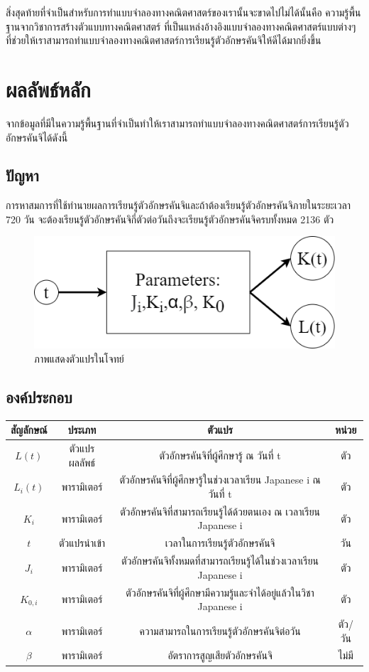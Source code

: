 \documentclass{article}
\begin{document}
สิ่งสุดท้ายที่จำเป็นสำหรับการทำแบบจำลองทางคณิตศาสตร์ของเรานั้นจะขาดไปไม่ได้นั้นคือ ความรู้พื้นฐานจากวิชาการสร้างตัวแบบทางคณิตศาสตร์\cite{MathematicalModeling} ที่เป็นแหล่งอ้างอิงแบบจำลองทางคณิตศาสตร์แบบต่างๆ ที่ช่วยให้เราสามารถทำแบบจำลองทางคณิตศาสตร์การเรียนรู้ตัวอักษรคันจิให้ดีได้มากยิ่งขึ้น

\section{ผลลัพธ์หลัก}
จากข้อมูลที่มีในความรู้พื้นฐานที่จำเป็นทำให้เราสามารถทำแบบจำลองทางคณิตศาสตร์การเรียนรู้ตัวอักษรคันจิได้ดังนี้

\subsection{ปัญหา} 
การหาสมการที่ใช้ทำนายผลการเรียนรู้ตัวอักษรคันจิและถ้าต้องเรียนรู้ตัวอักษรคันจิภายในระยะเวลา 720 วัน จะต้องเรียนรู้ตัวอักษรคันจิกี่ตัวต่อวันถึงจะเรียนรู้ตัวอักษรคันจิครบทั้งหมด 2136 ตัว
\begin{figure}[b]
\centering
\includegraphics[scale=0.5]{1.png}
\caption{ภาพแสดงตัวแปรในโจทย์}
\label{fig:inoutput}
\end{figure}
\subsection{องค์ประกอบ}
\begin{center}
\begin{tabular}{ |c|c|c|c| }
\hline
\textbf{สัญลักษณ์ } & \textbf{ประเภท } & \textbf{ตัวแปร } & \textbf{หน่วย } \\
\hline
$L(t)$ & ตัวแปรผลลัพธ์ & ตัวอักษรคันจิที่ผู้ศึกษารู้ ณ วันที่ t & ตัว \\
\hline
$L_i(t)$ & พารามิเตอร์ & ตัวอักษรคันจิที่ผู้ศึกษารู้ในช่วงเวลาเรียน Japanese i ณ วันที่ t & ตัว \\
\hline
$K_i$ & พารามิเตอร์ & ตัวอักษรคันจิที่สามารถเรียนรู้ได้ด้วยตนเอง ณ เวลาเรียน Japanese i & ตัว \\
\hline
$t$ & ตัวแปรนำเข้า & เวลาในการเรียนรู้ตัวอักษรคันจิ & วัน \\
\hline 
$J_i$ & พารามิเตอร์ & ตัวอักษรคันจิทั้งหมดที่สามารถเรียนรู้ได้ในช่วงเวลาเรียน Japanese i & ตัว \\
\hline
$K_{0,i}$ & พารามิเตอร์ & ตัวอักษรคันจิที่ผู้ศึกษามีความรู้และจำได้อยู่แล้วในวิชา Japanese i & ตัว \\
\hline
$\alpha$ & พารามิเตอร์ & ความสามารถในการเรียนรู้ตัวอักษรคันจิต่อวัน & ตัว/วัน \\
\hline 
$\beta $ & พารามิเตอร์ & อัตราการสูญเสียตัวอักษรคันจิ & ไม่มี \\
\hline 
\end{tabular}
\end{center}
\end{document}
